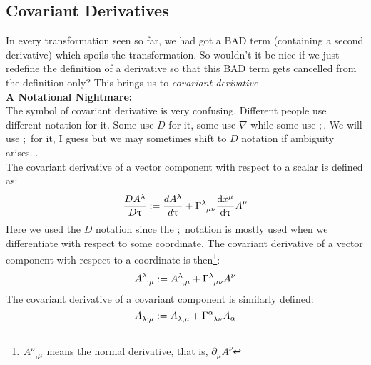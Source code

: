 \subsection{Covariant Derivatives}
In every transformation seen so far, we had got a BAD term (containing a second derivative) which spoils the transformation. So wouldn't it be nice if we just redefine the definition of a derivative so that this BAD term gets cancelled from the definition only? This brings us to \textit{covariant derivative} 
\\[0.3cm]
\textbf{A Notational Nightmare:}\\[0.3cm]
The symbol of covariant derivative is very confusing. Different people use different notation for it. Some use $D$ for it, some use $\nabla$ while some use $;$. We will use $;$ for it, I guess but we may sometimes shift to $D$ notation if ambiguity arises...\\[0.3cm]
The covariant derivative of a vector component with respect to a scalar is defined as:
$$\frac{DA^\lambda}{D\uptau} := \frac{dA^\lambda}{d\uptau}+ \tensor{\Gamma}{^\lambda _\mu _\nu}\dv{x^\mu}{\uptau}A^\nu$$
Here we used the $D$ notation since the $;$ notation is mostly used when we differentiate with respect to some coordinate. The covariant derivative of a vector component with respect to a coordinate is then\footnote{$\tensor{A}{^\nu _, _\mu}$ means the normal derivative, that is, $\partial_\mu A^\nu$}: 
$$\tensor{A}{^\lambda _; _\mu} :=  \tensor{A}{^\lambda _, _\mu} +\tensor{\Gamma}{^\lambda _\mu _\nu}A^\nu$$
The covariant derivative of a covariant component is similarly defined:
$$\tensor{A}{_\lambda _; _\mu} :=  \tensor{A}{_\lambda _, _\mu} +\tensor{\Gamma}{^\alpha _\lambda _\nu}A_\alpha$$
